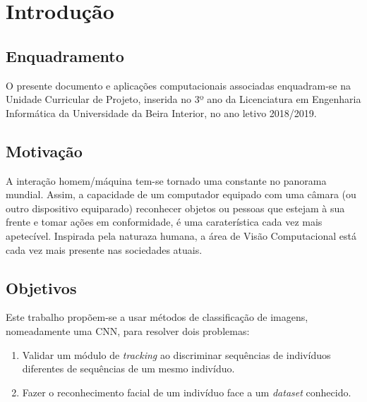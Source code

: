 \chapter{Introdução}
\label{chap:intro}

\section{Enquadramento}
\label{sec:amb} %

O presente documento e aplicações computacionais associadas enquadram-se na Unidade Curricular de Projeto, inserida no 3º ano da Licenciatura em Engenharia Informática da Universidade da Beira Interior, no ano letivo 2018/2019.

\section{Motivação}
\label{sec:mot}
A interação homem/máquina tem-se tornado uma constante no panorama mundial. Assim, a capacidade de um computador equipado com uma câmara (ou outro dispositivo equiparado) reconhecer objetos ou pessoas que estejam à sua frente e tomar ações em conformidade, é uma caraterística cada vez mais apetecível. Inspirada pela naturaza humana, a área de Visão Computacional está cada vez mais presente nas sociedades atuais.

\section{Objetivos}
\label{sec:obj}
Este trabalho propõem-se a usar métodos de classificação de imagens, nomeadamente uma \ac{CNN}, para resolver dois problemas: 

\begin{enumerate}
    \item Validar um módulo de \textit{tracking} ao discriminar sequências de indivíduos diferentes de sequências de um mesmo indivíduo.
    \item Fazer o reconhecimento facial de um indivíduo face a um \emph{dataset} conhecido.
\end{enumerate}

